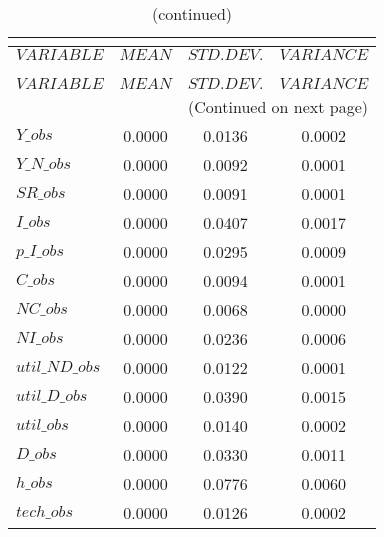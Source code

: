  
\begin{center}
\begin{longtable}{lccc} 
\caption{THEORETICAL MOMENTS}\\
 \label{Table:th_moments}\\
\toprule 
$VARIABLE       $	 & 	 $         MEAN$	 & 	 $    STD. DEV.$	 & 	 $     VARIANCE$\\
\midrule \endfirsthead 
\caption{(continued)}\\
 \toprule \\ 
$VARIABLE       $	 & 	 $         MEAN$	 & 	 $    STD. DEV.$	 & 	 $     VARIANCE$\\
\midrule \endhead 
\midrule \multicolumn{4}{r}{(Continued on next page)} \\ \bottomrule \endfoot 
\bottomrule \endlastfoot 
$Y\_obs         $	 & 	       0.0000	 & 	       0.0136	 & 	       0.0002 \\ 
$Y\_N\_obs      $	 & 	       0.0000	 & 	       0.0092	 & 	       0.0001 \\ 
$SR\_obs        $	 & 	       0.0000	 & 	       0.0091	 & 	       0.0001 \\ 
$I\_obs         $	 & 	       0.0000	 & 	       0.0407	 & 	       0.0017 \\ 
$p\_I\_obs      $	 & 	       0.0000	 & 	       0.0295	 & 	       0.0009 \\ 
$C\_obs         $	 & 	       0.0000	 & 	       0.0094	 & 	       0.0001 \\ 
$NC\_obs        $	 & 	       0.0000	 & 	       0.0068	 & 	       0.0000 \\ 
$NI\_obs        $	 & 	       0.0000	 & 	       0.0236	 & 	       0.0006 \\ 
$util\_ND\_obs  $	 & 	       0.0000	 & 	       0.0122	 & 	       0.0001 \\ 
$util\_D\_obs   $	 & 	       0.0000	 & 	       0.0390	 & 	       0.0015 \\ 
$util\_obs      $	 & 	       0.0000	 & 	       0.0140	 & 	       0.0002 \\ 
$D\_obs         $	 & 	       0.0000	 & 	       0.0330	 & 	       0.0011 \\ 
$h\_obs         $	 & 	       0.0000	 & 	       0.0776	 & 	       0.0060 \\ 
$tech\_obs      $	 & 	       0.0000	 & 	       0.0126	 & 	       0.0002 \\ 
\end{longtable}
 \end{center}

